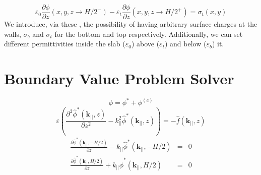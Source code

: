 \documentclass[ twoside,openright,titlepage,numbers=noenddot,%
headinclude,footinclude,cleardoublepage=empty,abstract=on,
BCOR=5mm,paper=a4,fontsize=11pt
]{scrreprt}
\begin{document}
\begin{equation}\varepsilon_0 \frac{\partial \phi}{\partial z}(x,y,z\rightarrow H/2^-)-\varepsilon_t \frac{\partial \phi}{\partial z}(x,y,z\rightarrow H/2^+)=\sigma_t(x,y)\label{eq:dppoissonbcs4}\end{equation} 
We introduce, via these \bcs, the possibility of having arbitrary surface charges at the walls, $\sigma_b$ and $\sigma_t$ for the bottom and top respectively. Additionally, we can set different permittivities inside the slab ($\varepsilon_0$) above ($\varepsilon_t$) and below ($\varepsilon_b$) it.

\section{Boundary Value Problem Solver}
\begin{equation}  \phi = \phi^* + \phi^{(c)}\end{equation}  
\begin{equation}
  \varepsilon  \left( \frac{\partial ^2 \hat{\phi}^*(\mathbf{k}_{||},z)}{\partial z^2} -k_{||}^2 \hat{\phi}^*(\mathbf{k}_{||},z)  \right) = -\hat{f}(\mathbf{k}_{||},z)
\end{equation}
\begin{eqnarray}
  \frac{\partial \hat{\phi}^*(\mathbf{k}_{||},-H/2)}{\partial z} -  k_{||} \hat{\phi}^*(\mathbf{k}_{||},-H/2)&=&0 \\
  \frac{\partial \hat{\phi}^*(\mathbf{k}_{||},H/2)}{\partial z}  +  k_{||} \hat{\phi}^*(\mathbf{k}_{||},H/2) &=&0
\label{eq:dppoisson_ewald}
\end{eqnarray}
\end{document}
